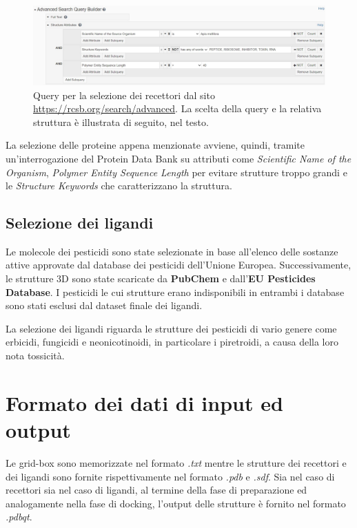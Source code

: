 \begin{figure}
    \centering
    \includegraphics[scale=0.45]{images/chapter3/rcsb_query.jpg}
    \caption[Query per la selezione dei recettori.]{Query per la selezione dei recettori dal sito \url{https://rcsb.org/search/advanced}. La scelta della query e la relativa struttura è illustrata di seguito, nel testo.}
    \label{fig:rcsb_query}
\end{figure}

La selezione delle proteine appena menzionate avviene, quindi, tramite un'interrogazione del Protein Data Bank su attributi come \textit{Scientific Name of the Organism}, \textit{Polymer Entity Sequence Length} per evitare strutture troppo grandi e le \textit{Structure Keywords} che caratterizzano la struttura.

\subsection{Selezione dei ligandi}
Le molecole dei pesticidi sono state selezionate in base all'elenco delle sostanze attive approvate dal database dei pesticidi dell'Unione Europea. Successivamente, le strutture 3D sono state scaricate da \textbf{PubChem} e dall'\textbf{EU Pesticides Database}. 
I pesticidi le cui strutture erano indisponibili in entrambi i database sono stati esclusi dal dataset finale dei ligandi.

La selezione dei ligandi riguarda le strutture dei pesticidi di vario genere come erbicidi, fungicidi e neonicotinoidi, in particolare i piretroidi, a causa della loro nota tossicità.  


\section{Formato dei dati di input ed output}
Le grid-box sono memorizzate nel formato \textit{.txt} mentre le strutture dei recettori e dei ligandi sono fornite rispettivamente nel formato \textit{.pdb} e \textit{.sdf}.
Sia nel caso di recettori sia nel caso di ligandi, al termine della fase di preparazione ed analogamente nella fase di docking, l'output delle strutture è fornito nel formato \textit{.pdbqt}.

